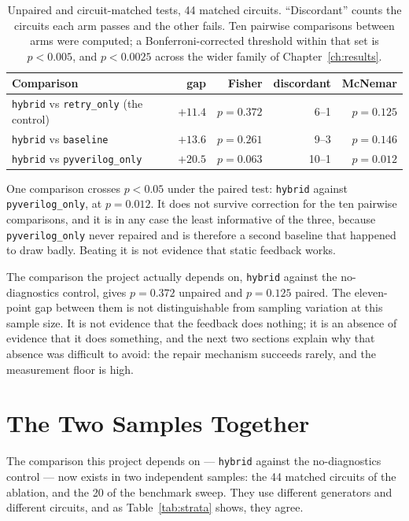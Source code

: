\documentclass[11pt,a4paper,titlepage=false]{scrreprt}
\begin{document}
\begin{table}[H]
\centering
\small
\begin{tabular}{@{}l r r r r@{}}
\toprule
\textbf{Comparison} & \textbf{gap} & \textbf{Fisher} & \textbf{discordant} & \textbf{McNemar} \\
\midrule
\texttt{hybrid} vs \texttt{retry\_only} (the control) & $+11.4$ & $p=0.372$ & 6--1 & $p=0.125$ \\
\texttt{hybrid} vs \texttt{baseline}                  & $+13.6$ & $p=0.261$ & 9--3 & $p=0.146$ \\
\texttt{hybrid} vs \texttt{pyverilog\_only}           & $+20.5$ & $p=0.063$ & 10--1 & $p=0.012$ \\
\bottomrule
\end{tabular}
\caption{Unpaired and circuit-matched tests, 44 matched circuits. ``Discordant'' counts the
circuits each arm passes and the other fails. Ten pairwise comparisons between arms were
computed; a Bonferroni-corrected threshold within that set is $p<0.005$, and $p<0.0025$
across the wider family of Chapter~\ref{ch:results}.}
\label{tab:tests}
\end{table}

One comparison crosses $p<0.05$ under the paired test: \texttt{hybrid} against
\texttt{pyverilog\_only}, at $p=0.012$. It does not survive correction for the ten pairwise
comparisons, and it is in any case the least informative of the three, because
\texttt{pyverilog\_only} never repaired and is therefore a second baseline that happened to
draw badly. Beating it is not evidence that static feedback works.

The comparison the project actually depends on, \texttt{hybrid} against the no-diagnostics
control, gives $p=0.372$ unpaired and $p=0.125$ paired. The eleven-point gap between them is
not distinguishable from sampling variation at this sample size. It is not evidence that the
feedback does nothing; it is an absence of evidence that it does something, and the next two
sections explain why that absence was difficult to avoid: the repair mechanism succeeds
rarely, and the measurement floor is high.

\section{The Two Samples Together}\label{sec:res-strata}

The comparison this project depends on --- \texttt{hybrid} against the no-diagnostics control
--- now exists in two independent samples: the 44 matched circuits of the ablation, and the 20
of the benchmark sweep. They use different generators and different circuits, and as
Table~\ref{tab:strata} shows, they agree.
\end{document}
